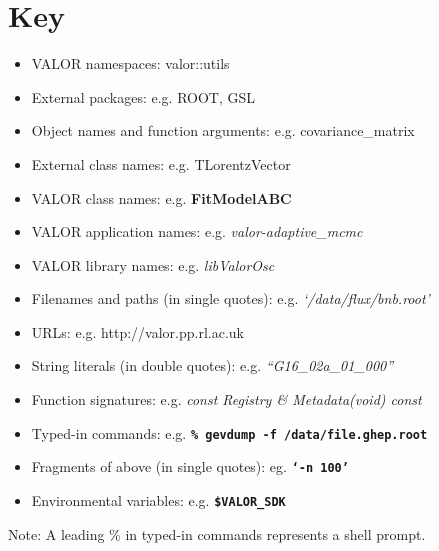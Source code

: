 
\section*{Key}

\begin{itemize}
    \begin{itemize}
      \item VALOR namespaces: valor::utils
      \item External packages: e.g. ROOT, GSL
      \item Object names and function arguments: e.g. {\color{amber}covariance\_matrix}
      \item External class names: e.g. {\color{cadmiumgreen} TLorentzVector}
      \item VALOR class names: e.g. {\color{cadmiumgreen} \bf FitModelABC}
      \item VALOR application names: e.g. {\it valor-adaptive\_mcmc}
      \item VALOR library names: e.g. {\it libValorOsc}
      \item Filenames and paths (in single quotes): e.g. {\it`/data/flux/bnb.root’}
      \item URLs: e.g. {\color{blue} http://valor.pp.rl.ac.uk}
      \item String literals (in double quotes): e.g. {\it “G16\_02a\_01\_000”}
      \item Function signatures: e.g. {\it \color{cadmiumred} const Registry \& Metadata(void) const}
      \item Typed-in commands: e.g. {\bf \tt \% gevdump -f /data/file.ghep.root}
      \item Fragments of above (in single quotes): eg. {\bf \tt ‘-n 100’}
      \item Environmental variables: e.g. {\bf \tt \$VALOR\_SDK}
    \end{itemize}
\end{itemize}

Note: A leading \% in typed-in commands represents a shell prompt.

